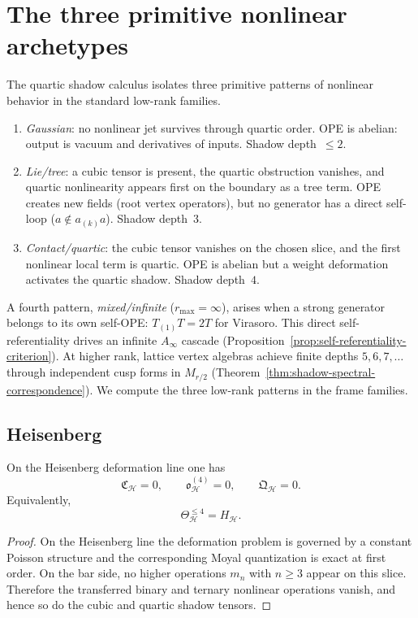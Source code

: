 \section{The three primitive nonlinear archetypes}
\label{sec:nms-three-archetypes}

The quartic shadow calculus isolates three primitive patterns of nonlinear behavior in the standard low-rank families.
\begin{enumerate}[label=\textup{(\roman*)}]
\item \emph{Gaussian}: no nonlinear jet survives through quartic order.
 OPE is abelian: output is vacuum and derivatives of inputs.
 Shadow depth~$\le 2$.
\item \emph{Lie/tree}: a cubic tensor is present, the quartic obstruction vanishes, and quartic nonlinearity appears first on the boundary as a tree term.
 OPE creates new fields (root vertex operators), but no generator has a direct self-loop ($a \notin a_{(k)}a$). Shadow depth~$3$.
\item \emph{Contact/quartic}: the cubic tensor vanishes on the chosen slice, and the first nonlinear local term is quartic.
 OPE is abelian but a weight deformation activates the quartic shadow. Shadow depth~$4$.
\end{enumerate}
A fourth pattern, \emph{mixed/infinite} ($r_{\max} = \infty$), arises when a strong generator belongs to its own self-OPE: $T_{(1)}T = 2T$ for Virasoro. This direct self-referentiality drives an infinite $A_\infty$ cascade
(Proposition~\ref{prop:self-referentiality-criterion}).
At higher rank, lattice vertex algebras achieve finite depths $5, 6, 7, \dotsc$ through independent cusp forms in $M_{r/2}$ (Theorem~\ref{thm:shadow-spectral-correspondence}).
We compute the three low-rank patterns in the frame families.

\subsection{Heisenberg}
\label{subsec:nms-heisenberg}

\begin{theorem}
\label{thm:nms-heisenberg-exact-linearity}
On the Heisenberg deformation line one has
\[
\mathfrak C_{\mathcal H}=0,
\qquad
\mathfrak o_{\mathcal H}^{(4)}=0,
\qquad
\mathfrak Q_{\mathcal H}=0.
\]
Equivalently,
\[
\Theta_{\mathcal H}^{\le 4}=H_{\mathcal H}.
\]
\end{theorem}

\begin{proof}
On the Heisenberg line the deformation problem is governed by a constant Poisson structure and the corresponding Moyal quantization is exact at first order. On the bar side, no higher operations $m_n$ with $n\ge 3$ appear on this slice. Therefore the transferred binary and ternary nonlinear operations vanish, and hence so do the cubic and quartic shadow tensors.\qedhere
\end{proof}

